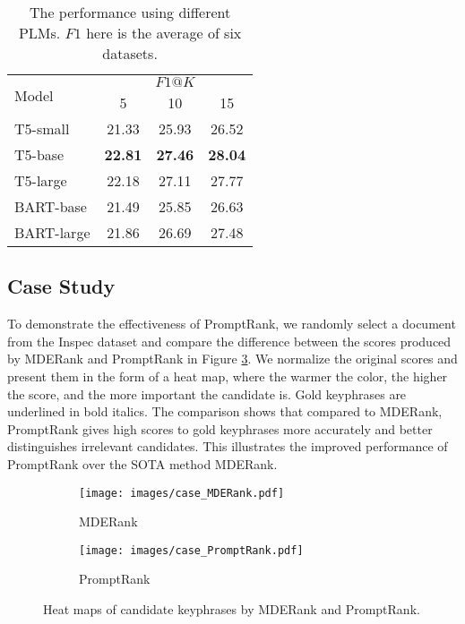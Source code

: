 \documentclass[11pt]{article}
\begin{document}
\begin{table}
\centering
{}
\begin{tabular}{lccc} 
\toprule
\multirow{2}{*}{Model} & \multicolumn{3}{c}{$F1@K$}  \\ 
\cline{2-4}
                       & 5     & 10    & 15        \\ 
\midrule
T5-small               & 21.33 & 25.93 & 26.52     \\
T5-base                & \textbf{22.81} & \textbf{27.46} & \textbf{28.04}     \\
T5-large               & 22.18 & 27.11 & 27.77     \\
BART-base              & 21.49 & 25.85 & 26.63     \\
BART-large             & 21.86 & 26.69 & 27.48     \\
\bottomrule
\end{tabular}
\caption{The performance using different PLMs. $F1$ here is the average of six datasets.}
\label{tb: model}
\end{table}





\subsection{Case Study}


To demonstrate the effectiveness of PromptRank, we randomly select a document from the Inspec dataset and compare the difference between the scores produced by MDERank and PromptRank in Figure \ref{fg: case}. We normalize the original scores and present them in the form of a heat map, where the warmer the color, the higher the score, and the more important the candidate is. Gold keyphrases are underlined in bold italics. The comparison shows that compared to MDERank, PromptRank gives high scores to gold keyphrases more accurately and better distinguishes irrelevant candidates. This illustrates the improved performance of PromptRank over the SOTA method MDERank.

\begin{figure}[ht]
     \centering
     \begin{subfigure}[b]{0.48\textwidth}
         \centering
         \texttt{[image: images/case\_MDERank.pdf]}
         \caption{MDERank}
         \label{fig:y equals x}
     \end{subfigure}
    
     \begin{subfigure}[b]{0.48\textwidth}
         \centering
         \texttt{[image: images/case\_PromptRank.pdf]}
         \caption{PromptRank}
         \label{fig:three sin x}
     \end{subfigure}
            \caption{Heat maps of candidate keyphrases by MDERank and PromptRank.}
        \label{fg: case}
\end{figure}
\end{document}

